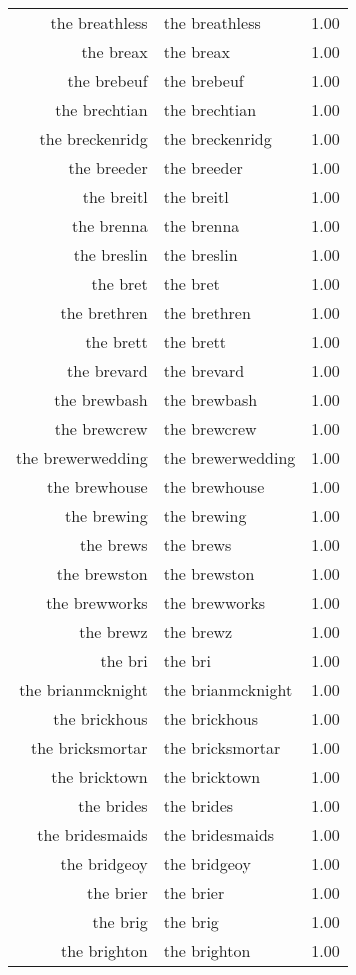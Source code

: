 \begin{table}[ht]
\begin{tabular}{rlr}
  the breathless & the breathless & 1.00 \\ 
  the breax & the breax & 1.00 \\ 
  the brebeuf & the brebeuf & 1.00 \\ 
  the brechtian & the brechtian & 1.00 \\ 
  the breckenridg & the breckenridg & 1.00 \\ 
  the breeder & the breeder & 1.00 \\ 
  the breitl & the breitl & 1.00 \\ 
  the brenna & the brenna & 1.00 \\ 
  the breslin & the breslin & 1.00 \\ 
  the bret & the bret & 1.00 \\ 
  the brethren & the brethren & 1.00 \\ 
  the brett & the brett & 1.00 \\ 
  the brevard & the brevard & 1.00 \\ 
  the brewbash & the brewbash & 1.00 \\ 
  the brewcrew & the brewcrew & 1.00 \\ 
  the brewerwedding & the brewerwedding & 1.00 \\ 
  the brewhouse & the brewhouse & 1.00 \\ 
  the brewing & the brewing & 1.00 \\ 
  the brews & the brews & 1.00 \\ 
  the brewston & the brewston & 1.00 \\ 
  the brewworks & the brewworks & 1.00 \\ 
  the brewz & the brewz & 1.00 \\ 
  the bri & the bri & 1.00 \\ 
  the brianmcknight & the brianmcknight & 1.00 \\ 
  the brickhous & the brickhous & 1.00 \\ 
  the bricksmortar & the bricksmortar & 1.00 \\ 
  the bricktown & the bricktown & 1.00 \\ 
  the brides & the brides & 1.00 \\ 
  the bridesmaids & the bridesmaids & 1.00 \\ 
  the bridgeoy & the bridgeoy & 1.00 \\ 
  the brier & the brier & 1.00 \\ 
  the brig & the brig & 1.00 \\ 
  the brighton & the brighton & 1.00 \\ 

\end{tabular}
\end{table}

